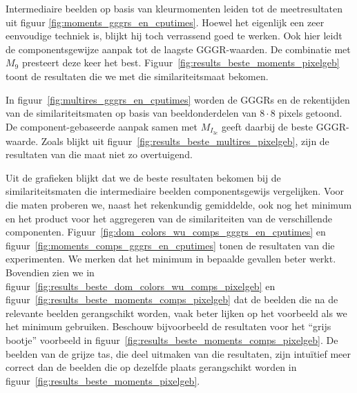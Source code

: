 Intermediaire beelden op basis van kleurmomenten leiden tot de meetresultaten uit 
figuur \ref{fig:moments_gggrs_en_cputimes}. Hoewel het eigenlijk een zeer eenvoudige
techniek is, blijkt hij toch verrassend goed te werken. Ook hier leidt de
componentsgewijze aanpak tot de laagste GGGR-waarden. De combinatie met $M_9$ presteert
deze keer het best. Figuur~\ref{fig:results_beste_moments_pixelgeb} toont de resultaten
die we met die similariteitsmaat bekomen.

In figuur~\ref{fig:multires_gggrs_en_cputimes} worden de GGGRs en de rekentijden van
de similariteitsmaten op basis van beeldonderdelen van $8 \cdot 8$ pixels getoond.
De component-gebaseerde aanpak samen met
$M_{I_{3c}}$ geeft daarbij de beste GGGR-waarde. Zoals blijkt uit
figuur~\ref{fig:results_beste_multires_pixelgeb}, zijn de resultaten van die
maat niet zo overtuigend.

Uit de grafieken blijkt dat we de beste resultaten bekomen bij de similariteitsmaten 
die intermediaire beelden componentsgewijs vergelijken. Voor die maten proberen we, naast 
het rekenkundig gemiddelde, ook nog het minimum en het product voor het aggregeren 
van de similariteiten van de verschillende componenten. Figuur~\ref{fig:dom_colors_wu_comps_gggrs_en_cputimes}
en figuur~\ref{fig:moments_comps_gggrs_en_cputimes} tonen de resultaten van
die experimenten. We merken dat het minimum in bepaalde
gevallen beter werkt. Bovendien zien we in 
figuur~\ref{fig:results_beste_dom_colors_wu_comps_pixelgeb} en
figuur~\ref{fig:results_beste_moments_comps_pixelgeb} dat de beelden
die na de relevante beelden gerangschikt worden, vaak beter lijken op het voorbeeld als
we het minimum gebruiken. Beschouw bijvoorbeeld de resultaten voor het ``grijs bootje'' 
voorbeeld in figuur~\ref{fig:results_beste_moments_comps_pixelgeb}.
De beelden van de grijze tas, die deel uitmaken van die resultaten, zijn intu\"itief meer correct
dan de beelden die op dezelfde plaats gerangschikt worden in 
figuur~\ref{fig:results_beste_moments_pixelgeb}. 


